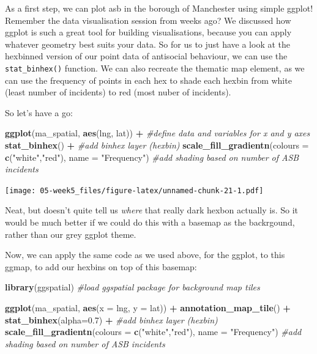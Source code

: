 \documentclass[]{book}
\newenvironment{Shaded}{\begin{snugshade}}{\end{snugshade}}
\newcommand{\CommentTok}[1]{\textcolor[rgb]{0.56,0.35,0.01}{\textit{#1}}}
\newcommand{\DataTypeTok}[1]{\textcolor[rgb]{0.13,0.29,0.53}{#1}}
\newcommand{\FloatTok}[1]{\textcolor[rgb]{0.00,0.00,0.81}{#1}}
\newcommand{\KeywordTok}[1]{\textcolor[rgb]{0.13,0.29,0.53}{\textbf{#1}}}
\newcommand{\NormalTok}[1]{#1}
\newcommand{\OperatorTok}[1]{\textcolor[rgb]{0.81,0.36,0.00}{\textbf{#1}}}
\newcommand{\StringTok}[1]{\textcolor[rgb]{0.31,0.60,0.02}{#1}}
\begin{document}
As a first step, we can plot asb in the borough of Manchester using simple ggplot! Remember the data visualisation session from weeks ago? We discussed how ggplot is such a great tool for building visualisations, because you can apply whatever geometry best suits your data. So for us to just have a look at the hexbinned version of our point data of antisocial behaviour, we can use the \texttt{stat\_binhex()} function. We can also recreate the thematic map element, as we can use the frequency of points in each hex to shade each hexbin from white (least number of incidents) to red (most nuber of incidents).

So let's have a go:

\begin{Shaded}
\begin{Highlighting}[]
\KeywordTok{ggplot}\NormalTok{(ma_spatial, }\KeywordTok{aes}\NormalTok{(lng, lat)) }\OperatorTok{+}\StringTok{                        }\CommentTok{#define data and variables for x and y axes}
\StringTok{  }\KeywordTok{stat_binhex}\NormalTok{() }\OperatorTok{+}\StringTok{                                                         }\CommentTok{#add binhex layer (hexbin)}
\StringTok{  }\KeywordTok{scale_fill_gradientn}\NormalTok{(}\DataTypeTok{colours =} \KeywordTok{c}\NormalTok{(}\StringTok{"white"}\NormalTok{,}\StringTok{"red"}\NormalTok{), }\DataTypeTok{name =} \StringTok{"Frequency"}\NormalTok{)    }\CommentTok{#add shading based on number of ASB incidents}
\end{Highlighting}
\end{Shaded}

\texttt{[image: 05-week5\_files/figure-latex/unnamed-chunk-21-1.pdf]}

Neat, but doesn't quite tell us \emph{where} that really dark hexbon actually is. So it would be much better if we could do this with a basemap as the backrgound, rather than our grey ggplot theme.

Now, we can apply the same code as we used above, for the ggplot, to this ggmap, to add our hexbins on top of this basemap:

\begin{Shaded}
\begin{Highlighting}[]
\KeywordTok{library}\NormalTok{(ggspatial) }\CommentTok{#load ggspatial package for background map tiles}

\KeywordTok{ggplot}\NormalTok{(ma_spatial, }\KeywordTok{aes}\NormalTok{(}\DataTypeTok{x =}\NormalTok{ lng, }\DataTypeTok{y =}\NormalTok{ lat)) }\OperatorTok{+}
\StringTok{  }\KeywordTok{annotation_map_tile}\NormalTok{() }\OperatorTok{+}\StringTok{ }
\StringTok{  }\KeywordTok{stat_binhex}\NormalTok{(}\DataTypeTok{alpha=}\FloatTok{0.7}\NormalTok{) }\OperatorTok{+}\StringTok{                                                         }\CommentTok{#add binhex layer (hexbin)}
\StringTok{  }\KeywordTok{scale_fill_gradientn}\NormalTok{(}\DataTypeTok{colours =} \KeywordTok{c}\NormalTok{(}\StringTok{"white"}\NormalTok{,}\StringTok{"red"}\NormalTok{), }\DataTypeTok{name =} \StringTok{"Frequency"}\NormalTok{)    }\CommentTok{#add shading based on number of ASB incidents }
\end{Highlighting}
\end{Shaded}
\end{document}
